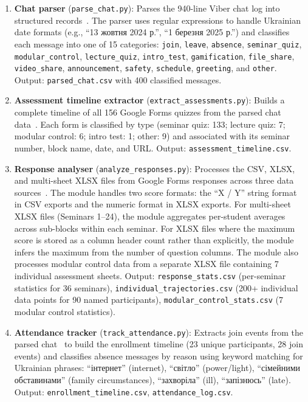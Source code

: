 \begin{enumerate}
\item \textbf{Chat parser} (\texttt{parse\_chat.py}): Parses the 940-line Viber chat log into structured records~\cite{Thomas2008}. The parser uses regular expressions to handle Ukrainian date formats (e.g., ``13 жовтня 2024 р.'', ``1 березня 2025 р.'') and classifies each message into one of 15 categories: \texttt{join}, \texttt{leave}, \texttt{absence}, \texttt{seminar\_quiz}, \texttt{modular\_control}, \texttt{lecture\_quiz}, \texttt{intro\_test}, \texttt{gamification}, \texttt{file\_share}, \texttt{video\_share}, \texttt{announcement}, \texttt{safety}, \texttt{schedule}, \texttt{greeting}, and \texttt{other}. Output: \texttt{parsed\_chat.csv} with 400 classified messages.

\item \textbf{Assessment timeline extractor} (\texttt{extract\_assessments.py}): Builds a complete timeline of all 156 Google Forms quizzes from the parsed chat data~\cite{Page2021, Moher2009PRISMA, PageEtAl2021}. Each form is classified by type (seminar quiz: 133; lecture quiz: 7; modular control: 6; intro test: 1; other: 9) and associated with its seminar number, block name, date, and URL. Output: \texttt{assessment\_timeline.csv}.

\item \textbf{Response analyser} (\texttt{analyze\_responses.py}): Processes the CSV, XLSX, and multi-sheet XLSX files from Google Forms responses across three data sources~\cite{ary}. The module handles two score formats: the ``X / Y'' string format in CSV exports and the numeric format in XLSX exports. For multi-sheet XLSX files (Seminars 1--24), the module aggregates per-student averages across sub-blocks within each seminar. For XLSX files where the maximum score is stored as a column header count rather than explicitly, the module infers the maximum from the number of question columns. The module also processes modular control data from a separate XLSX file containing 7 individual assessment sheets. Output: \texttt{response\_stats.csv} (per-seminar statistics for 36 seminars), \texttt{individual\_trajectories.csv} (200+ individual data points for 90 named participants), \texttt{modular\_control\_stats.csv} (7 modular control statistics).

\item \textbf{Attendance tracker} (\texttt{track\_attendance.py}): Extracts join events from the parsed chat~\cite{Thomas2008, Hong2018} to build the enrollment timeline (23 unique participants, 28 join events) and classifies absence messages by reason using keyword matching for Ukrainian phrases: ``інтернет'' (internet), ``світло'' (power/light), ``сімейними обставинами'' (family circumstances), ``захворіла'' (ill), ``запізнюсь'' (late). Output: \texttt{enrollment\_timeline.csv}, \texttt{attendance\_log.csv}.


\end{enumerate}
